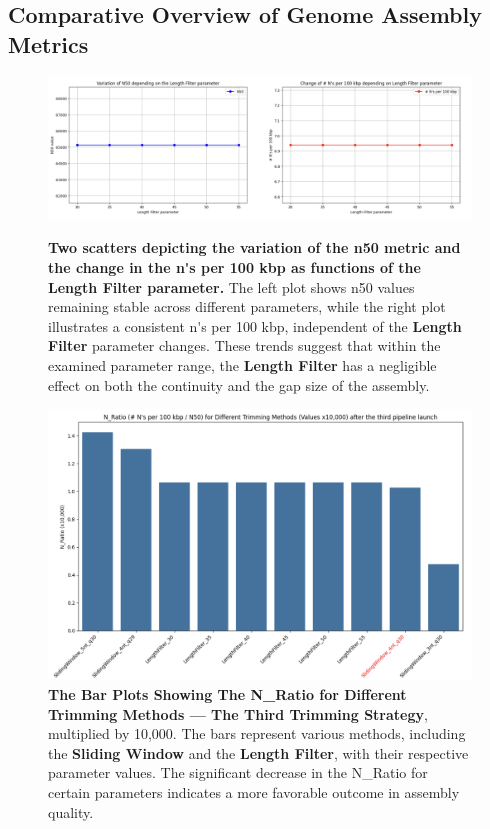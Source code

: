 \subsection{Comparative Overview of Genome Assembly Metrics}

\begin{figure}[H]
    \centering
    \includegraphics[width=0.7\linewidth]{resources/images/length_filter_variation_2.png}
    \caption{\textbf{Two \gls{scatter}s depicting the variation of the \gls{n50} metric and the change in the \gls{n's per 100 kbp} as functions of the Length Filter parameter.} The left plot shows \gls{n50} values remaining stable across different parameters, while the right plot illustrates a consistent \gls{n's per 100 kbp}, independent of the \textbf{Length Filter} parameter changes. These trends suggest that within the examined parameter range, the \textbf{Length Filter} has a negligible effect on both the continuity and the gap size of the \gls{assembly}.}
    \label{fig:length_filter_variation_2}
    
    \vspace{1cm}
    
    \includegraphics[width=0.7\linewidth]{resources/images/n_ratio_3.png}
    \caption{\textbf{The Bar Plots Showing The N\_Ratio for Different Trimming Methods — The Third Trimming Strategy}, multiplied by 10,000. The bars represent various methods, including the \textbf{Sliding Window} and the \textbf{Length Filter}, with their respective parameter values. The significant decrease in the N\_Ratio for certain parameters indicates a more favorable outcome in \gls{assembly} quality.}
    \label{fig:n_ratio_3}
\end{figure}



